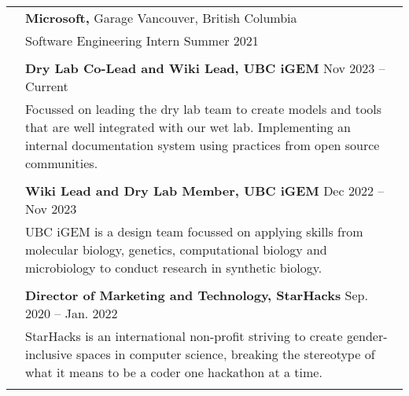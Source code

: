 \documentclass[letterpaper, 11pt]{article}
\begin{document}
\begin{longtable}{p{1.3in}p{4.8in}}
	 & {\textbf{Microsoft,}} Garage \hfill Vancouver, British Columbia                                                                                                                                        \\
	 & Software Engineering Intern \hfill Summer 2021                                                                                                                                                         \\
	 &                                                                                                                                                                                                        \\

	\color{Blue}{Service and outreach}
	 & \textbf{Dry Lab Co-Lead and Wiki Lead, UBC iGEM} \hfill Nov 2023 -- Current                                                                                                                            \\
	 & Focussed on leading the dry lab team to create models and tools that are well integrated with our wet lab. Implementing an internal documentation system using practices from open source communities. \\
	 &                                                                                                                                                                                                        \\

	 & \textbf{Wiki Lead and Dry Lab Member, UBC iGEM} \hfill Dec 2022 -- Nov 2023                                                                                                                            \\
	 & UBC iGEM is a design team focussed on applying skills from molecular biology, genetics, computational biology and microbiology to conduct research in synthetic biology.                               \\
	 &                                                                                                                                                                                                        \\

	 & \textbf{Director of Marketing and Technology, StarHacks} \hfill Sep. 2020 -- Jan. 2022                                                                                                                 \\
	 & StarHacks is an international non-profit striving to create gender-inclusive spaces in computer science, breaking the stereotype of what it means to be a coder one hackathon at a time.               \\
	 &                                                                                                                                                                                                        \\


\end{longtable}
\end{document}

